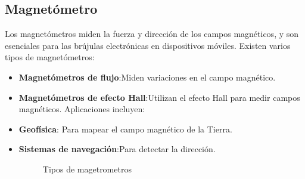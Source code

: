 \subsection{Magnetómetro}
Los magnetómetros miden la fuerza y dirección de los campos magnéticos, y son esenciales para las brújulas electrónicas en dispositivos móviles. Existen varios tipos de magnetómetros:
\begin{itemize}
	\item \textbf{Magnetómetros de flujo}:Miden variaciones en el campo magnético.
	\item \textbf{Magnetómetros de efecto Hall}:Utilizan el efecto Hall para medir campos magnéticos. Aplicaciones incluyen:
	\item \textbf{Geofísica}: Para mapear el campo magnético de la Tierra.
	\item \textbf{Sistemas de navegación}:Para detectar la dirección.
	\begin{figure}[h]
	\centering
	\hfill
	\caption{Tipos de magetrometros}
	\label{fig:Magnetrometros}
	\end{figure}
\end{itemize}
